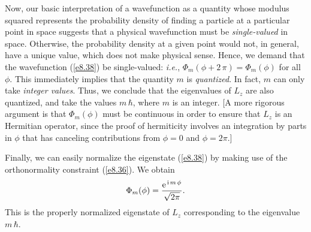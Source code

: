 Now, our basic interpretation of a wavefunction
as a quantity whose modulus squared represents the probability density
of finding a particle at a particular point in space suggests that a
physical wavefunction must be {\em single-valued}\/ in space. Otherwise, the probability density at a given point would not, in general, have a unique value, which does not
make physical sense. 
Hence, we demand that the wavefunction (\ref{e8.38})
be single-valued: {\em i.e.}, $\Phi_m(\phi+2\,\pi)= \Phi_m(\phi)$
for all $\phi$. This immediately implies that the quantity $m$ is {\em quantized}. 
In fact, $m$ can only take {\em integer values}. Thus, we conclude that the eigenvalues
of $L_z$ are also quantized, and take the values $m\,\hbar$, where $m$ is an integer. [A more rigorous argument is that
$\Phi_m(\phi)$ must be continuous in order to ensure that $L_z$ is an Hermitian operator, since the proof of
hermiticity involves an  integration by parts in $\phi$ that has canceling contributions from $\phi=0$ and $\phi=2\pi$.]

Finally, we can easily normalize the eigenstate (\ref{e8.38}) by making use of the
orthonormality constraint (\ref{e8.36}). We obtain
\begin{equation}
\Phi_m(\phi) = \frac{{\rm e}^{\,{\rm i}\,m\,\phi}}{\sqrt{2\pi}}.
\end{equation}
This is the properly normalized eigenstate of $L_z$ corresponding to the eigenvalue $m\,\hbar$. 

